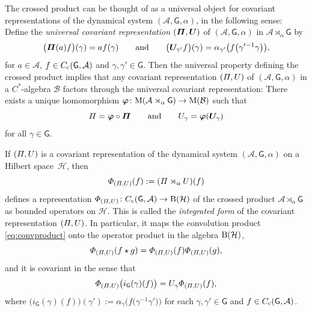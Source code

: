 \documentclass[pdftex]{sigma}
\numberwithin{equation}{section}
\newcommand{\mbf}[1]{{\boldsymbol {#1} }}
\newcommand{\sfG}{\mathsf{G}}
\newcommand{\Pim}{{\mit\Pi}}
\def\alg{{\mathcal A}}
\def\balg{{\mathcal B}}
\def\hil{{\mathcal H}}
\begin{document}
The crossed product can be thought of as a universal
object for covariant representations of the dynamical system
$(\alg,\sfG,\alpha)$, in the following sense: Define the \emph{universal
 covariant representation} $(\mbf\Pim,\mbf U)$ of $(\alg,\sfG,\alpha)$
in $\alg\rtimes_\alpha \sfG$ by
\[
\big(\mbf\Pim(a)f\big)(\gamma)=a f(\gamma) \qquad \mbox{and} \qquad
\big(\mbf U_{\gamma'}f\big)(\gamma) =
\alpha_{\gamma'}\big(f\big(\gamma'{}^{-1} \gamma\big)\big) ,
\]
for $a\in\alg$, $f\in C_{\rm c}(\sfG,\alg)$ and $\gamma,\gamma'\in \sfG$. Then the
universal property defining the crossed product implies that any covariant representation $(\Pim,U)$ of
$(\alg,\sfG,\alpha)$ in a $C^*$-algebra $\balg$ factors through the
universal covariant representation: There exists a unique homomorphism
\mbox{$\mbf\varphi\colon {\rm M}(\alg\rtimes_\alpha \sfG)\to{\rm M}(\balg)$} such that
\[
\Pim=\mbf\varphi\circ\mbf\Pim \qquad \mbox{and} \qquad U_\gamma =
\mbf\varphi(\mbf U_\gamma)
\]
for all $\gamma\in \sfG$.

If $(\Pim,U)$ is a covariant representation of the dynamical system
$(\alg,\sfG,\alpha)$ on a Hilbert space~$\hil$, then
\[
{\mit\Phi}_{(\Pim,U)}(f):=(\Pim\rtimes_\alpha U)(f)
\]
defines a representation ${\mit\Phi}_{(\Pim,U)}\colon C_{\rm c}(\sfG,\alg)\to{\rm B}(\hil)$
of the crossed product $\alg\rtimes_\alpha \sfG$ as bounded operators on
$\hil$. This is called the \emph{integrated form} of the covariant
representation $(\Pim,U)$. In particular, it maps the convolution
product \eqref{eq:convproduct} onto the operator product in the
algebra ${\rm B}(\hil)$,
\[
{\mit\Phi}_{(\Pim,U)}(f\star g) = {\mit\Phi}_{(\Pim,U)}(f)
{\mit\Phi}_{(\Pim,U)}(g) ,
\]
and it is covariant in the sense that
\[
{\mit\Phi}_{(\Pim,U)}\big(i_\sfG(\gamma)(f)\big) = U_\gamma
{\mit\Phi}_{(\Pim,U)}(f) ,
\]
where $\big(i_\sfG(\gamma)(f)\big)(\gamma'):=\alpha_\gamma\big(f\big(\gamma^{-1}
\gamma'\big)\big)$ for each $\gamma,\gamma'\in \sfG$ and $f\in C_{\rm
 c}(\sfG,\alg)$.
\end{document}

